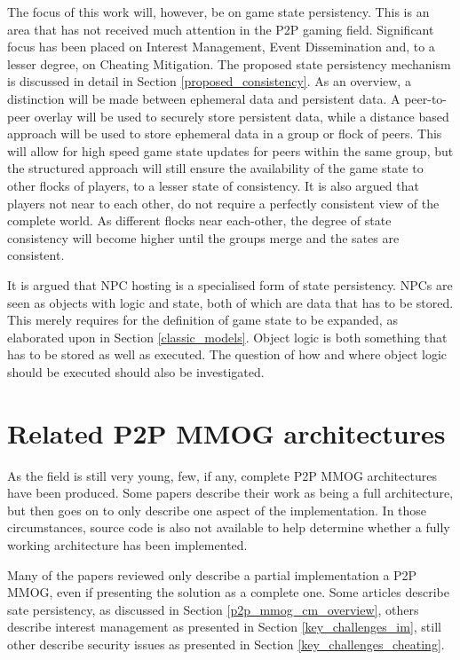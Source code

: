\documentclass[journal,oneside,a4paper,onecolumn]{IEEEtran}
\begin{document}
The focus of this work will, however, be on game state persistency. This is an area that has not received much attention in the P2P gaming field. Significant focus has been placed on Interest Management, Event Dissemination and, to a lesser degree, on Cheating Mitigation. The proposed state persistency mechanism is discussed in detail in Section \ref{proposed_consistency}. As an overview, a distinction will be made between ephemeral data and persistent data. A peer-to-peer overlay will be used to securely store persistent data, while a distance based approach will be used to store ephemeral data in a group or flock of peers. This will allow for high speed game state updates for peers within the same group, but the structured approach will still ensure the availability of the game state to other flocks of players, to a lesser state of consistency. It is also argued that players not near to each other, do not require a perfectly consistent view of the complete world. As different flocks near each-other, the degree of state consistency will become higher until the groups merge and the sates are consistent.

It is argued that NPC hosting is a specialised form of state persistency. NPCs are seen as objects with logic and state, both of which are data that has to be stored. This merely requires for the definition of game state to be expanded, as elaborated upon in Section \ref{classic_models}. Object logic is both something that has to be stored as well as executed. The question of how and where object logic should be executed should also be investigated.

\section{Related P2P MMOG architectures}
\label{related_architectures}

As the field is still very young, few, if any, complete P2P MMOG architectures have been produced. Some papers describe their work as being a full architecture, but then goes on to only describe one aspect of the implementation. In those circumstances, source code is also not available to help determine whether a fully working architecture has been implemented.

Many of the papers reviewed only describe a partial implementation a P2P MMOG, even if presenting the solution as a complete one. Some articles describe sate persistency, as discussed in Section \ref{p2p_mmog_cm_overview}, others describe interest management as presented in Section \ref{key_challenges_im}, still other describe security issues as presented in Section \ref{key_challenges_cheating}.
\end{document}
